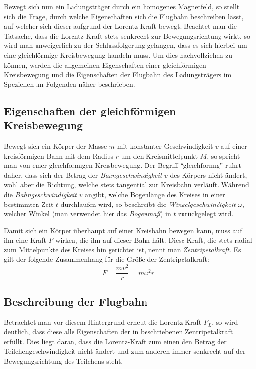 Bewegt sich nun ein Ladungstr\"ager durch ein homogenes Magnetfeld, so stellt sich die Frage, durch welche Eigenschaften sich
die Flugbahn beschreiben l\"asst, auf welcher sich dieser aufgrund der Lorentz-Kraft bewegt. Beachtet man die Tatsache, dass die
Lorentz-Kraft stets senkrecht zur Bewegungsrichtung wirkt, so wird man unweigerlich zu der Schlussfolgerung gelangen, dass es sich
hierbei um eine gleichf\"ormige Kreisbewegung handeln muss. Um dies nachvollziehen zu k\"onnen, werden die allgemeinen Eigenschaften
einer gleichf\"ormigen Kreisbewegung und die Eigenschaften der Flugbahn des Ladungstr\"agers im Speziellen im Folgenden n\"aher
beschrieben.

\subsection{Eigenschaften der gleichf\"ormigen Kreisbewegung}
\label{sec:kreisbewegung}

Bewegt sich ein K\"orper der Masse \(m\) mit konstanter Geschwindigkeit \(v\) auf einer kreisf\"ormigen Bahn mit dem Radius \(r\) um den
Kreismittelpunkt \(M\), so spricht man von einer gleichf\"ormigen Kreisbewegung. Der Begriff "`gleichf\"ormig"' r\"uhrt daher,
dass sich der Betrag der \textit{Bahngeschwindigkeit} \(v\) des K\"orpers nicht \"andert, wohl aber die Richtung, welche stets
tangential zur Kreisbahn verl\"auft. W\"ahrend die \textit{Bahngeschwindigkeit} \(v\) angibt, welche Bogenl\"ange des Kreises in einer
bestimmten Zeit \(t\) durchlaufen wird, so beschreibt die \textit{Winkelgeschwindigkeit} \(\omega\), welcher Winkel (man verwendet hier
das \textit{Bogenma{\ss}}) in \(t\) zur\"uckgelegt wird.

Damit sich ein K\"orper \"uberhaupt auf einer Kreisbahn bewegen kann, muss auf ihn eine Kraft \(F\) wirken, die ihn auf dieser Bahn
h\"alt. Diese Kraft, die stets radial zum Mittelpunkte des Kreises hin gerichtet ist, nennt man \textit{Zentripetalkraft}.
Es gilt der folgende Zusammenhang f\"ur die Gr\"o{\ss}e der Zentripetalkraft:
\begin{equation}
\label{eq:zentripetalkraft}
F = \frac{mv^2}{r} = m\omega^2r
\end{equation}

\subsection{Beschreibung der Flugbahn}
\label{sec:flugbahnbeschreibung}

Betrachtet man vor diesem Hintergrund erneut die Lorentz-Kraft \(F_L\), so wird deutlich, dass diese alle Eigenschaften der in
 beschriebenen Zentripetalkraft erf\"ullt. Dies liegt daran, dass die Lorentz-Kraft zum einen den Betrag
der Teilchengeschwindigkeit nicht \"andert und zum anderen immer senkrecht auf der Bewegungsrichtung des Teilchens steht.

